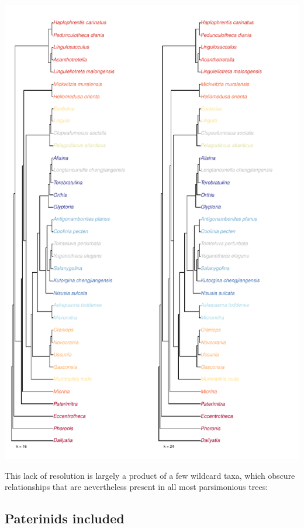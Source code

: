 \documentclass[]{book}
\theoremstyle{definition}
\theoremstyle{definition}
\theoremstyle{definition}
\theoremstyle{remark}
\begin{document}
\includegraphics{Brachiopod_phylogeny_files/figure-latex/unnamed-chunk-6-4.pdf}

This lack of resolution is largely a product of a few wildcard taxa,
which obscure relationships that are nevertheless present in all most
parsimonious trees:

\hypertarget{paterinids-included}{%
\subsection{Paterinids included}\label{paterinids-included}}
\end{document}
